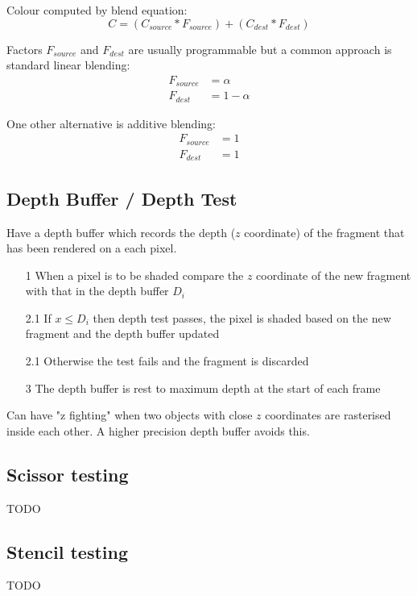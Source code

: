 \documentclass[a4paper]{article}
\begin{document}
Colour computed by blend equation:
\[
  C = (C_{source} * F_{source}) + (C_{dest} * F_{dest})
\]

Factors $F_{source}$ and $F_{dest}$ are usually programmable but a common
approach is standard linear blending:
\begin{align*}
  F_{source} &= \alpha \\
  F_{dest} &= 1 - \alpha
\end{align*}

One other alternative is additive blending:
\begin{align*}
  F_{source} &= 1 \\
  F_{dest} &= 1
\end{align*}

\subsection{Depth Buffer / Depth Test}

Have a depth buffer which records the depth ($z$ coordinate) of the fragment
that has been rendered on a each pixel.

\begin{enumerate}
  \item[1]   When a pixel is to be shaded compare the $z$ coordinate of the new
    fragment with that in the depth buffer $D_{i}$
  \item[2.1] If $x \leq D_{i}$ then depth test passes, the pixel is shaded based
    on the new fragment and the depth buffer updated
  \item[2.1] Otherwise the test fails and the fragment is discarded
  \item[3]   The depth buffer is rest to maximum depth at the start of each
    frame
\end{enumerate}

Can have "z fighting" when two objects with close $z$ coordinates are rasterised
inside each other. A higher precision depth buffer avoids this.

\subsection{Scissor testing}

TODO

\subsection{Stencil testing}

TODO
\end{document}
